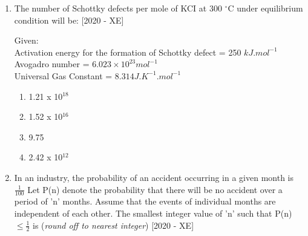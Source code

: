 \documentclass[journal]{IEEEtran}
\begin{document}
\begin{enumerate}
    \item The number of Schottky defects per mole of KCI at 300 $^\circ$C under equilibrium condition will be: \hfill{[2020 - XE]}
    
    Given:\\
    Activation energy for the formation of Schottky defect = 250 $kJ.mol^{-1}$\\
    Avogadro number =  $6.023 \times 10^23 mol^{-1}$\\
    Universal Gas Constant = $8.314 J.K^{-1}.mol^{-1}$
    \begin{enumerate}
        \item 1.21 x 10$^{18}$
        \item 1.52 x 10$^{16}$
        \item 9.75
        \item 2.42 x 10$^{12}$
    \end{enumerate}
    
    \item In an industry, the probability of an accident occurring in a given month is $\frac{1}{100}$ Let P(n) denote the probability that there will be no accident over a period of 'n' months. Assume that the events of individual months are independent of each other. The smallest integer value of 'n' such that P(n)$\leq \frac{1}{2}$ is \underline{\hspace{3cm}} (\textit{round off to nearest integer}) \hfill{[2020 - XE]}
    

\end{enumerate}
\end{document}
